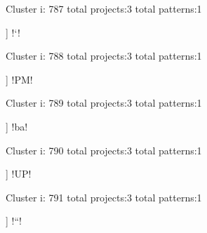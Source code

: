 Cluster i: 787
total projects:3
total patterns:1
\begin{multicols}{1}
\begin{description}[noitemsep,topsep=0pt]
\item [[3] ] \cverb!`!
\end{description}
\end{multicols}







Cluster i: 788
total projects:3
total patterns:1
\begin{multicols}{1}
\begin{description}[noitemsep,topsep=0pt]
\item [[3] ] \cverb!PM!
\end{description}
\end{multicols}







Cluster i: 789
total projects:3
total patterns:1
\begin{multicols}{1}
\begin{description}[noitemsep,topsep=0pt]
\item [[3] ] \cverb!ba!
\end{description}
\end{multicols}







Cluster i: 790
total projects:3
total patterns:1
\begin{multicols}{1}
\begin{description}[noitemsep,topsep=0pt]
\item [[3] ] \cverb!UP!
\end{description}
\end{multicols}







Cluster i: 791
total projects:3
total patterns:1
\begin{multicols}{1}
\begin{description}[noitemsep,topsep=0pt]
\item [[3] ] \cverb!``!
\end{description}
\end{multicols}







